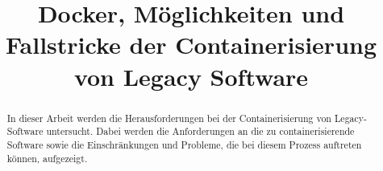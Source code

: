 \documentclass[10pt,conference,a4paper]{IEEEtran}
\begin{document}
\title{Docker, Möglichkeiten und Fallstricke der Containerisierung von Legacy Software}

\author{%
}

\maketitle

\pagestyle{plain}

\maketitle

\begin{abstract}
	In dieser Arbeit werden die Herausforderungen bei der Containerisierung von Legacy-Software untersucht. Dabei werden die Anforderungen an die zu containerisierende Software sowie die Einschränkungen und Probleme, die bei diesem Prozess auftreten können, aufgezeigt.
\end{abstract}








\end{document}
